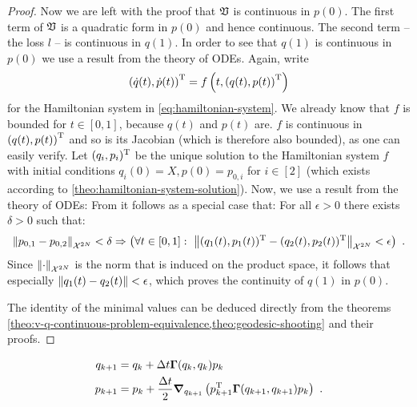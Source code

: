 \begin{proof}
	Now we are left with the proof that $\mathfrak{V}$ is continuous in $p(0)$.
	The first term of $\mathfrak{V}$ is a quadratic form in $p(0)$ and hence continuous.
	The second term -- the loss $l$ -- is continuous in $q(1)$.
	In order to see that $q(1)$ is continuous in $p(0)$ we use a result from the theory of ODEs.
	Again, write
	\begin{equation}
		\left(\dot{q}(t), \dot{p}(t)\right)^{\mathrm{T}} = f\left(t, \left(q(t), p(t)\right)^{\mathrm{T}} \right)
	\end{equation}
	for the Hamiltonian system in \cref{eq:hamiltonian-system}.
	We already know that $f$ is bounded for $t \in [0, 1]$, because $q(t)$ and $p(t)$ are.
	$f$ is continuous in $\left(q(t), p(t)\right)^{\mathrm{T}}$ and so is its Jacobian (which is therefore also bounded), as one can easily verify.
	Let $(q_i, p_i)^{\mathrm{T}}$ be the unique solution to the Hamiltonian system $f$ with initial conditions $q_i(0) = X, p(0) = p_{0, i}$ for $i \in [2]$ (which exists according to \cref{theo:hamiltonian-system-solution}).
	Now, we use a result from the theory of ODEs:
	From \cite[Theorem~1.4.1]{arino06} it follows as a special case that:
	For all $\epsilon > 0$ there exists $\delta > 0$ such that:
	\begin{equation}
		\norm{p_{0, 1} - p_{0, 2}}_{\mathcal{X}^{2N}} < \delta \Rightarrow 
		\left(\forall t \in [0, 1]:\ \norm{(q_1(t), p_1(t))^{\mathrm{T}} - (q_2(t), p_2(t))^{\mathrm{T}}}_{\mathcal{X}^{2N}} < \epsilon \right) \ .
	\end{equation}
	Since $\norm{\cdot}_{\mathcal{X}^{2N}}$ is the norm that is induced on the product space, it follows that especially $\norm{q_1(t) - q_2(t)} < \epsilon$, which proves the continuity of $q(1)$ in $p(0)$.
	
	The identity of the minimal values can be deduced directly from the theorems \cref{theo:v-q-continuous-problem-equivalence,theo:geodesic-shooting} and their proofs.
\end{proof}

\begin{equation}
	\label{eq:discrete-hamiltonian-system}
	\begin{split}
		q_{k+1} &= q_k + \Delta t \mathbf{\Gamma}(q_k, q_k) p_k\\
		p_{k+1} &= p_k + \frac{\Delta t}{2} \grad_{q_{k+1}} \left(p_{k+1}^{\mathrm{T}} \mathbf{\Gamma}(q_{k+1}, q_{k+1}) p_k\right)\ .
	\end{split}
\end{equation}

